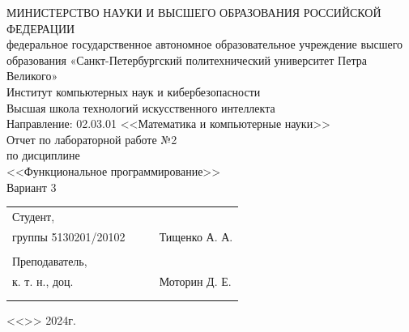 \documentclass[a4paper, final]{article}
\begin{document}
	
	
	
	\begin{center}
		\hfill \break
		\hfill \break
		\normalsize{МИНИСТЕРСТВО НАУКИ И ВЫСШЕГО ОБРАЗОВАНИЯ РОССИЙСКОЙ ФЕДЕРАЦИИ\\
			федеральное государственное автономное образовательное учреждение высшего образования «Санкт-Петербургский политехнический университет Петра Великого»\\[10pt]}
		\normalsize{Институт компьютерных наук и кибербезопасности}\\[10pt] 
		\normalsize{Высшая школа технологий искусственного интеллекта}\\[10pt] 
		\normalsize{Направление: 02.03.01 <<Математика и компьютерные науки>>}\\
		
		\hfill \break
		\hfill \break
		\hfill \break
		\hfill \break
		\large{Отчет по лабораторной работе №2}\\
		\large{по дисциплине}\\
		\large{<<Функциональное программирование>>}\\
		\large{Вариант 3}\\
		\hfill \break
		
	\end{center}
	
	\small{ 
		\begin{tabular}{lrrl}
			\!\!\!Студент, & \hspace{2cm} & & \\
			\!\!\!группы 5130201/20102 & \hspace{2cm} & \underline{\hspace{3cm}} &Тищенко А. А. \\\\
			\!\!\!Преподаватель,\\ \hspace{-5pt}к. т. н., доц. & \hspace{2cm} &  \underline{\hspace{3cm}} &  Моторин Д. Е. \\\\
			&&\hspace{4cm}
		\end{tabular}
		\begin{flushright}
			<<\underline{\hspace{1cm}}>>\underline{\hspace{2.5cm}} 2024г.
		\end{flushright}
	}
	
\end{document}
